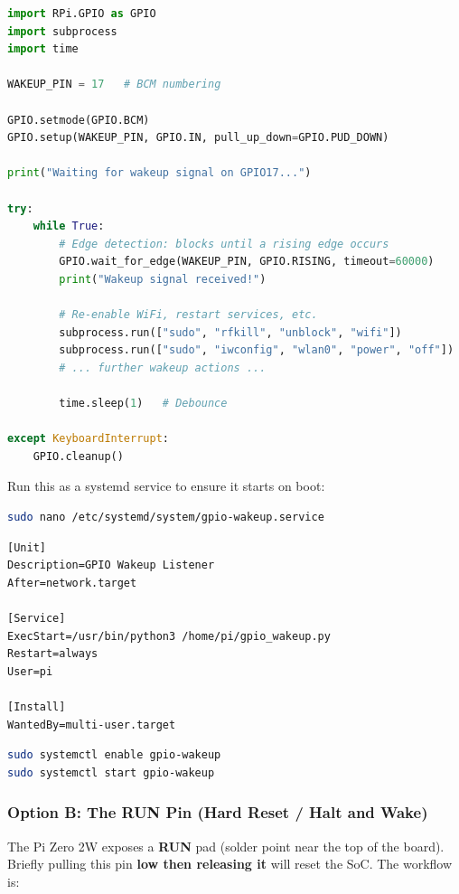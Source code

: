 \documentclass[11pt,letter]{article}
\begin{document}
\begin{lstlisting}[language=python, caption={GPIO edge-triggered wakeup listener}]
import RPi.GPIO as GPIO
import subprocess
import time

WAKEUP_PIN = 17   # BCM numbering

GPIO.setmode(GPIO.BCM)
GPIO.setup(WAKEUP_PIN, GPIO.IN, pull_up_down=GPIO.PUD_DOWN)

print("Waiting for wakeup signal on GPIO17...")

try:
    while True:
        # Edge detection: blocks until a rising edge occurs
        GPIO.wait_for_edge(WAKEUP_PIN, GPIO.RISING, timeout=60000)
        print("Wakeup signal received!")

        # Re-enable WiFi, restart services, etc.
        subprocess.run(["sudo", "rfkill", "unblock", "wifi"])
        subprocess.run(["sudo", "iwconfig", "wlan0", "power", "off"])
        # ... further wakeup actions ...

        time.sleep(1)   # Debounce

except KeyboardInterrupt:
    GPIO.cleanup()
\end{lstlisting}

Run this as a systemd service to ensure it starts on boot:
\begin{lstlisting}[language=bash, caption={Create a systemd service for the wakeup listener}]
sudo nano /etc/systemd/system/gpio-wakeup.service
\end{lstlisting}
\begin{lstlisting}[caption={gpio-wakeup.service unit file}]
[Unit]
Description=GPIO Wakeup Listener
After=network.target

[Service]
ExecStart=/usr/bin/python3 /home/pi/gpio_wakeup.py
Restart=always
User=pi

[Install]
WantedBy=multi-user.target
\end{lstlisting}
\begin{lstlisting}[language=bash]
sudo systemctl enable gpio-wakeup
sudo systemctl start gpio-wakeup
\end{lstlisting}

\subsubsection{Option B: The RUN Pin (Hard Reset / Halt and Wake)}

The Pi Zero 2W exposes a \textbf{RUN} pad (solder point near the top of the board). Briefly pulling this pin \textbf{low then releasing it} will reset the SoC. The workflow is:
\end{document}
